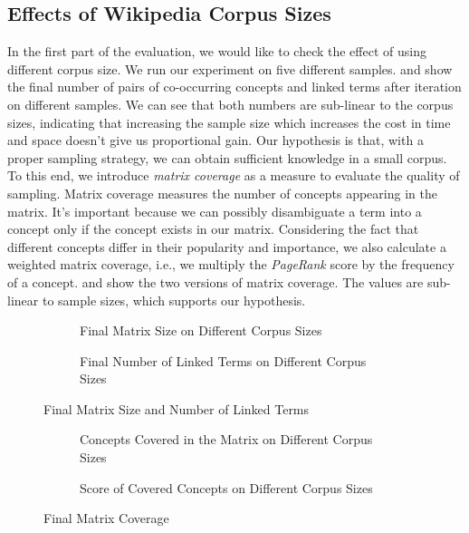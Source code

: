 \subsection{Effects of Wikipedia Corpus Sizes}
In the first part of the evaluation, we would like to check the effect of
using different corpus size.
We run our experiment on five different samples.
 and  show the final number of pairs of
co-occurring concepts and linked terms after iteration on different
samples. We can see that both numbers are sub-linear to the corpus sizes,
indicating that increasing the sample size which increases the cost in
time and space doesn't give us proportional gain.
Our hypothesis is that, with a proper sampling strategy,
we can obtain sufficient knowledge in a small corpus.
To this end, we introduce {\em matrix coverage} as a measure to evaluate the
quality of sampling. Matrix coverage measures the number of concepts
appearing in the matrix. It's important because we can possibly
disambiguate a term into a concept only if the concept exists in our matrix.
Considering the fact that
different concepts differ in their popularity and importance,
we also calculate a weighted matrix coverage, i.e.,
we multiply the \emph{PageRank} score by the frequency of a concept.
 and  show the two versions of
matrix coverage. The values are sub-linear to sample sizes,
which supports our hypothesis.

\begin{figure}[th]
\begin{subfigure}[t]{0.49\columnwidth}
\centering
{}
\caption{Final Matrix Size on Different Corpus Sizes}
\label{fig:m_final}
\end{subfigure}
\hfill
\begin{subfigure}[t]{0.49\columnwidth}
\centering
{}
\caption{Final Number of Linked Terms on Different Corpus Sizes}
\label{fig:l_final}
\end{subfigure}
\caption{Final Matrix Size and Number of Linked Terms}
\end{figure}

\begin{figure}[th]
\begin{subfigure}[t]{0.49\columnwidth}
\centering
{}
\caption{Concepts Covered in the Matrix on Different Corpus Sizes}
\label{fig:rows}
\end{subfigure}
\hfill
\begin{subfigure}[t]{0.49\columnwidth}
\centering
{}
\caption{Score of Covered Concepts on Different Corpus Sizes}
\label{fig:scores}
\end{subfigure}
\caption{Final Matrix Coverage}
\end{figure}

